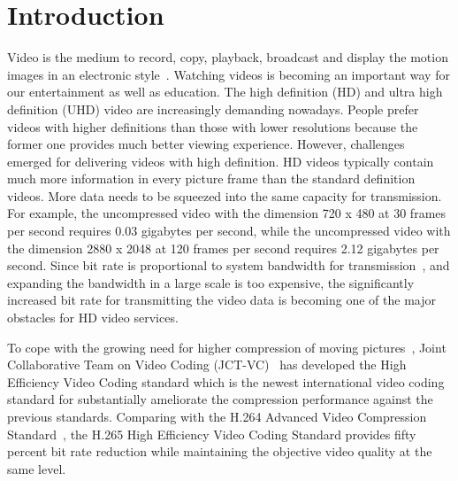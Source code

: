 \chapter{Introduction}\label{ch:chapter1} %

Video is the medium to record, copy, playback, broadcast
and display the motion images in an electronic style~\parencite{RN190}.
Watching videos is becoming an important way for our entertainment as well
as education.
The high definition (HD) and ultra high definition (UHD) video
are increasingly demanding nowadays.
People prefer videos with higher definitions than those with lower
resolutions because the former one provides much better viewing experience.
However, challenges emerged for delivering videos with high definition.
HD videos typically contain much more information in every picture frame than the
standard definition videos.
More data needs to be squeezed into the same capacity for transmission.
For example, the uncompressed video with the dimension 720 x 480 at 30 frames
per second requires 0.03 gigabytes per second, while the uncompressed video with
the dimension 2880 x 2048 at 120 frames per second requires 2.12 gigabytes per
second.
Since bit rate is proportional to system bandwidth for
transmission~\parencite{RN191}, and expanding the bandwidth in a large scale is
too expensive, the significantly increased bit rate
for transmitting the video data is becoming one of the
major obstacles for HD video services.

To cope with the growing need for higher compression of moving
pictures~\parencite{RN193}, Joint Collaborative Team on Video
Coding (JCT-VC)~\parencite{RN192} has developed the High Efficiency Video
Coding standard which is the newest international video coding standard for
substantially ameliorate the compression performance against the previous
standards.
Comparing with the H.264 Advanced Video Compression Standard~\parencite{RN194},
the H.265 High Efficiency Video Coding Standard provides fifty percent bit rate
reduction while maintaining the objective video quality at the same level.

